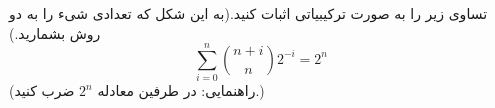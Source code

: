 \exercise
تساوی زیر را به صورت ترکیبیاتی اثبات کنید.(به این شکل که تعدادی شیء را به دو روش بشمارید.)
$$\sum_{i=0}^{n}\binom{n+i}{n}2^{-i} = 2^{n}$$
(راهنمایی: در طرفین معادله 
$2^{n}$
ضرب کنید.)